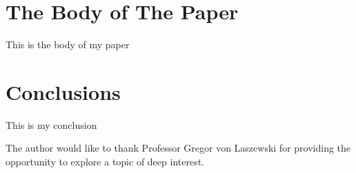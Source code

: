 \documentclass[sigconf]{acmart}
\begin{document}
\section{The Body of The Paper}
This is the body of my paper

\section{Conclusions}
This is my conclusion

\begin{acks}
The author would like to thank Professor Gregor von Laszewski for providing the opportunity to explore a topic of deep interest.

\end{acks}


 
\end{document}
